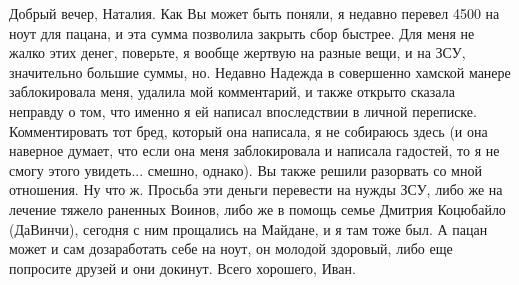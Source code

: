  
 
 
 
 

Добрый вечер, Наталия. Как Вы может быть поняли, я недавно перевел 4500 на ноут
для пацана, и эта сумма позволила закрыть сбор быстрее. Для меня не жалко этих
денег, поверьте, я вообще жертвую на разные вещи, и на ЗСУ, значительно большие
суммы, но. Недавно Надежда в совершенно хамской манере заблокировала меня,
удалила мой комментарий, и также открыто сказала неправду о том, что именно я
ей написал впоследствии в личной переписке. Комментировать тот бред, который
она написала, я не собираюсь здесь (и она наверное думает, что если она меня
заблокировала и написала гадостей, то я не смогу этого увидеть... смешно,
однако). Вы также решили разорвать со мной отношения. Ну что ж. Просьба эти
деньги перевести на нужды ЗСУ, либо же на лечение тяжело раненных Воинов, либо
же в помощь семье Дмитрия Коцюбайло (ДаВинчи), сегодня с ним прощались на
Майдане, и я там тоже был. А пацан может и сам дозаработать себе на ноут, он
молодой здоровый, либо еще попросите друзей и они докинут. Всего хорошего,
Иван.
